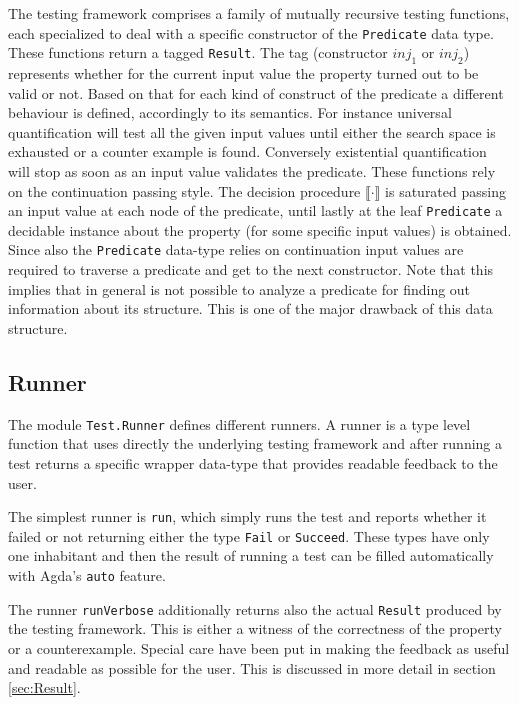 \documentclass[10pt,a4paper]{article}
\begin{document}
The testing framework comprises a family of mutually recursive testing functions, each specialized to deal with a specific constructor of the \texttt{Predicate} data type. These functions return a tagged \texttt{Result}.
The tag (constructor $inj_1$ or $inj_2$) represents whether for the current input value the property turned out to be valid or not.
Based on that for each kind of construct of the predicate a different behaviour is defined, accordingly to its semantics.
For instance universal quantification will test all the given input values until either the search space is exhausted or a counter example is found. Conversely existential quantification will stop as soon as an input value validates the predicate.
These functions rely on the continuation passing style.
The decision procedure $\llbracket \cdot \rrbracket$ is saturated passing an input value at each node of the predicate, until lastly at the leaf \texttt{Predicate} a decidable instance about the property (for some specific input values) is obtained.
Since also the \texttt{Predicate} data-type relies on continuation input values are required to traverse a predicate and get to the next constructor.
Note that this implies that in general is not possible to analyze a predicate for finding out information about its structure. This is one of the major drawback of this data structure.

\subsection{Runner}
The module \texttt{Test.Runner} defines different runners.
A runner is a type level function that uses directly the underlying testing framework and after running a test returns a specific wrapper data-type that provides readable feedback to the user.

The simplest runner is \texttt{run}, which simply runs the test and reports whether it failed or not returning either the type \texttt{Fail} or \texttt{Succeed}. These types have only one inhabitant and then the result of running a test can be filled automatically with Agda's \texttt{auto} feature.

The runner \texttt{runVerbose} additionally returns also the actual \texttt{Result} produced by the testing framework. This is either a witness of the correctness of the property or a counterexample.
Special care have been put in making the feedback as useful and readable as possible for the user. This is discussed in more detail in section 	\ref{sec:Result}.
\end{document}
